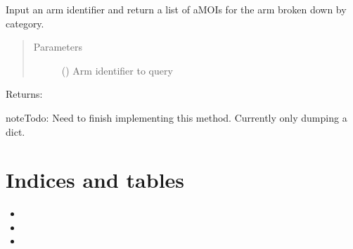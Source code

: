 \documentclass[letterpaper,10pt,english]{sphinxmanual}
\begin{document}
\begin{fulllineitems}
\begin{fulllineitems}
\end{fulllineitems}


\begin{fulllineitems}
\label{\detokenize{matchbox_api_utils:matchbox_api_utils.match_arms.TreatmentArms.get_amois_by_arm}}
Input an arm identifier and return a list of aMOIs for the arm broken
down by category.
\begin{quote}\begin{description}
\item[{Parameters}] \leavevmode
{} () \textendash{} Arm identifier to query

\end{description}\end{quote}

Returns:

\begin{sphinxadmonition}{note}{\label{matchbox_api_utils:index-5}Todo:}
Need to finish implementing this method.  Currently only dumping a
dict.
\end{sphinxadmonition}

\end{fulllineitems}


\end{fulllineitems}



\chapter{Indices and tables}
\label{\detokenize{index:indices-and-tables}}\begin{itemize}
\item {} 

\item {} 

\item {} 

\end{itemize}
\end{document}

